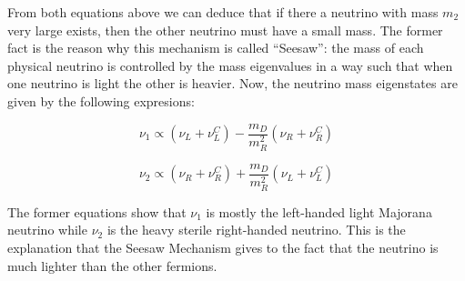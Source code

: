 From both equations above we can deduce that if there a neutrino with mass $m_2$ very large exists, then the other neutrino must have a small mass. 
The former fact is the reason why this mechanism is called ``Seesaw'': the mass of each physical neutrino is controlled by the mass eigenvalues in a way such that when one neutrino is light
the other is heavier. Now, the neutrino mass eigenstates are given by the following expresions:

\begin{equation}
\nu_1 \propto \left( \nu_L + \nu_L^C \right) - \frac{m_D}{m_R^2} \left( \nu_R + \nu_R^C \right)
\end{equation}

\begin{equation}
\nu_2 \propto \left( \nu_R + \nu_R^C \right) + \frac{m_D}{m_R^2} \left( \nu_L + \nu_L^C \right)
\end{equation}

The former equations show that $\nu_1$ is mostly the left-handed light Majorana neutrino while $\nu_2$ is the heavy sterile right-handed neutrino. This is the explanation 
that the Seesaw Mechanism gives to the fact that the neutrino is much lighter than the other fermions. 
 
 
 
 
 
 